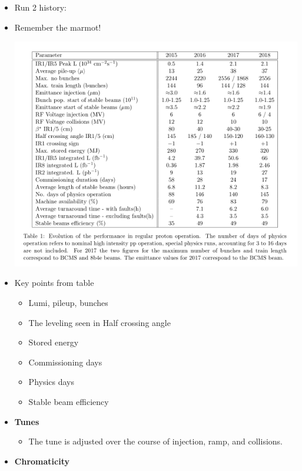 \begin{itemize}
\begin{itemize}
    \end{itemize}
    \item Run 2 history: \cite{lhcRun2}
    \item Remember the marmot! \cite{lhcRun2}
    \begin{center}
    \includegraphics[width=1\textwidth]{figures/experiment/run2History.png}
    \end{center}
    \item Key points from table \cite{lhcRun2}
    \begin{itemize}
        \item Lumi, pileup, bunches \cite{lhcRun2}
        \item The leveling seen in Half crossing angle \cite{lhcRun2}
        \item Stored energy \cite{lhcRun2}
        \item Commissioning days \cite{lhcRun2}
        \item Physics days \cite{lhcRun2}
        \item Stable beam efficiency \cite{lhcRun2}
    \end{itemize}
    \item \textbf{Tunes} \cite{lhcRun2}
    \begin{itemize}
        \item The tune is adjusted over the course of injection, ramp, and collisions. \cite{lhcRun2}
    \end{itemize}
    \item \textbf{Chromaticity} \cite{lhcRun2}
    \begin{itemize}

\end{itemize}
\end{itemize}
